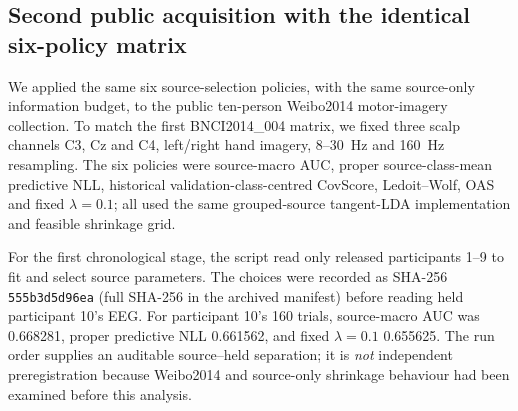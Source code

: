 \subsection{Second public acquisition with the identical six-policy matrix}
\label{sec:p3-weibo-common-matrix}
We applied the same six source-selection policies,
with the same source-only information budget,
to the public ten-person Weibo2014 motor-imagery
collection. To match the first BNCI2014\_004
matrix, we fixed three scalp channels C3, Cz and
C4, left/right hand imagery, 8--30~Hz and
160~Hz resampling. The six policies were
source-macro AUC, proper source-class-mean
predictive NLL, historical validation-class-centred
CovScore, Ledoit--Wolf, OAS and fixed
$\lambda=0.1$; all used the same grouped-source
tangent-LDA implementation and feasible
shrinkage grid.

For the first chronological stage, the script read
only released participants 1--9 to fit and
select source parameters. The choices were
recorded as SHA-256
\texttt{555b3d5d96ea} (full SHA-256 in the archived manifest)
before reading held participant 10's EEG.
For participant 10's 160 trials, source-macro
AUC was 0.668281, proper predictive NLL
0.661562, and fixed $\lambda=0.1$ 0.655625.
The run order supplies an auditable source--held
separation; it is \emph{not} independent
preregistration because Weibo2014 and
source-only shrinkage behaviour had been
examined before this analysis.

